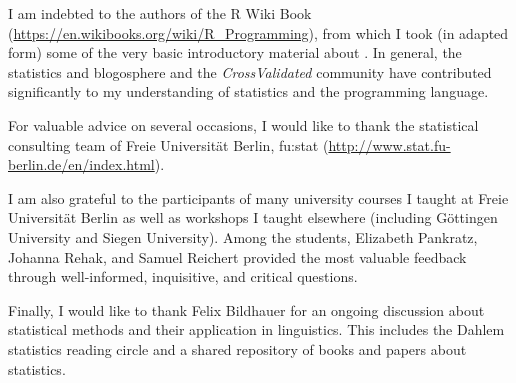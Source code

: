 
I am indebted to the authors of the R Wiki Book (\url{https://en.wikibooks.org/wiki/R_Programming}), from which I took (in adapted form) some of the very basic introductory material about .
In general, the statistics and  blogosphere and the \textit{CrossValidated} community have contributed significantly to my understanding of statistics and the  programming language.

For valuable advice on several occasions, I would like to thank the statistical consulting team of Freie Universität Berlin, fu:stat (\url{http://www.stat.fu-berlin.de/en/index.html}).

I am also grateful to the participants of many university courses I taught at Freie Universität Berlin as well as workshops I taught elsewhere (including Göttingen University and Siegen University).
Among the students, Elizabeth Pankratz, Johanna Rehak, and Samuel Reichert provided the most valuable feedback through well-informed, inquisitive, and critical questions.

Finally, I would like to thank Felix Bildhauer for an ongoing discussion about statistical methods and their application in linguistics.
This includes the Dahlem statistics reading circle and a shared repository of books and papers about statistics.


